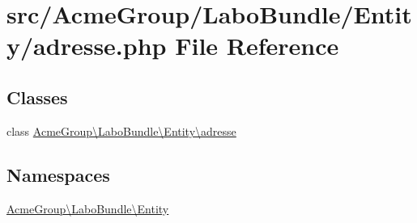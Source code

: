 \hypertarget{adresse_8php}{\section{src/\+Acme\+Group/\+Labo\+Bundle/\+Entity/adresse.php File Reference}
\label{adresse_8php}
}
\subsection*{Classes}
\begin{DoxyCompactItemize}
\item 
class \hyperlink{class_acme_group_1_1_labo_bundle_1_1_entity_1_1adresse}{Acme\+Group\textbackslash{}\+Labo\+Bundle\textbackslash{}\+Entity\textbackslash{}adresse}
\end{DoxyCompactItemize}
\subsection*{Namespaces}
\begin{DoxyCompactItemize}
\item 
 \hyperlink{namespace_acme_group_1_1_labo_bundle_1_1_entity}{Acme\+Group\textbackslash{}\+Labo\+Bundle\textbackslash{}\+Entity}
\end{DoxyCompactItemize}
